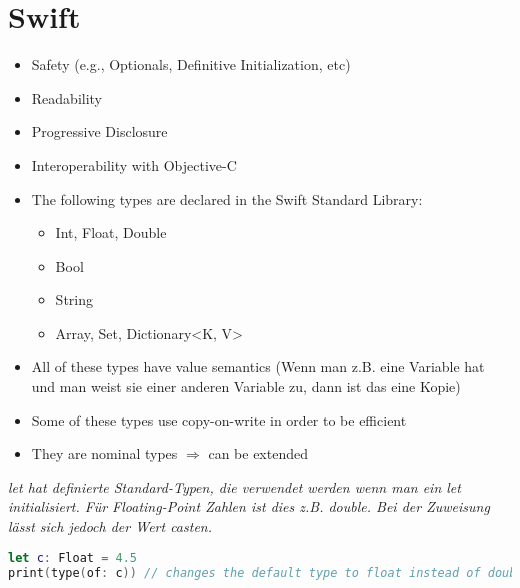\section{Swift}

\begin{breakbox}
\begin{itemize}
\tightlist
\item
  Safety (e.g., Optionals, Definitive Initialization, etc)
\item
  Readability
\item
  Progressive Disclosure
\item
  Interoperability with Objective-C
\end{itemize}
\end{breakbox}

\begin{breakbox}

\begin{itemize}
\tightlist
\item
  The following types are declared in the Swift Standard Library:

  \begin{itemize}
  \tightlist
  \item
    Int, Float, Double
  \item
    Bool
  \item
    String
  \item
    Array, Set, Dictionary\textless{}K, V\textgreater{}
  \end{itemize}
\item
  All of these types have value semantics (Wenn man z.B. eine Variable
  hat und man weist sie einer anderen Variable zu, dann ist das eine
  Kopie)
\item
  Some of these types use copy-on-write in order to be efficient
\item
  They are nominal types $\Rightarrow$ can be extended
\end{itemize}
\end{breakbox}

\begin{breakbox}

\textit{let hat definierte Standard-Typen, die verwendet werden wenn man
ein let initialisiert. Für Floating-Point Zahlen ist dies z.B. double.
Bei der Zuweisung lässt sich jedoch der Wert casten.}

\begin{lstlisting}[language=swift]
let c: Float = 4.5
print(type(of: c)) // changes the default type to float instead of double
\end{lstlisting}
\end{breakbox}


